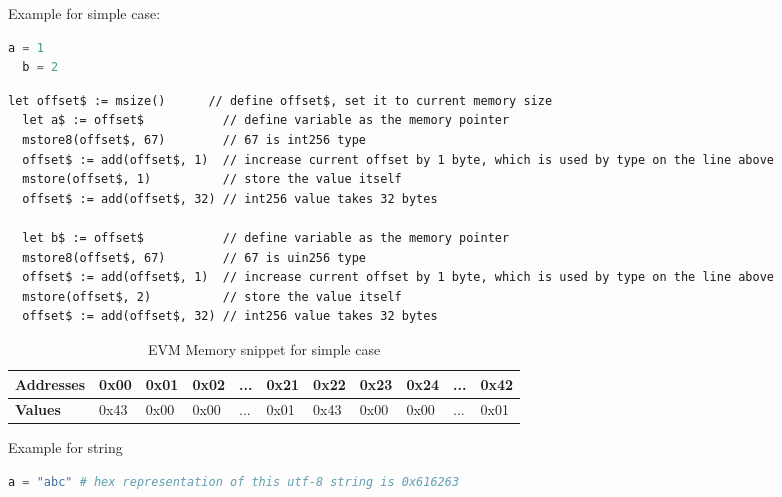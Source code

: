 Example for simple case:
   
\begin{lstlisting}[caption={Elixireum code for simple case}, language=elixir]
  a = 1
  b = 2
\end{lstlisting}

\begin{lstlisting}[caption={Generated yul code for simple case}, language=yul]
  let offset$ := msize()      // define offset$, set it to current memory size 
  let a$ := offset$           // define variable as the memory pointer
  mstore8(offset$, 67)        // 67 is int256 type
  offset$ := add(offset$, 1)  // increase current offset by 1 byte, which is used by type on the line above
  mstore(offset$, 1)          // store the value itself
  offset$ := add(offset$, 32) // int256 value takes 32 bytes

  let b$ := offset$           // define variable as the memory pointer
  mstore8(offset$, 67)        // 67 is uin256 type
  offset$ := add(offset$, 1)  // increase current offset by 1 byte, which is used by type on the line above
  mstore(offset$, 2)          // store the value itself
  offset$ := add(offset$, 32) // int256 value takes 32 bytes
\end{lstlisting}

\begin{table}[h!]
  \centering
  \renewcommand{\arraystretch}{1.2} %
  \begin{tabular}{|>{\centering\arraybackslash}m{2cm}|>{\centering\arraybackslash}m{1cm}|>{\centering\arraybackslash}m{1cm}|>{\centering\arraybackslash}m{1cm}|>{\centering\arraybackslash}m{0.75cm}|>{\centering\arraybackslash}m{1cm}|>{\centering\arraybackslash}m{1cm}|>{\centering\arraybackslash}m{1cm}|>{\centering\arraybackslash}m{1cm}|>{\centering\arraybackslash}m{0.75cm}|>{\centering\arraybackslash}m{1cm}|}
  \hline
  \textbf{Addresses} & 0x00 & 0x01 & 0x02 & ... & 0x21 & 0x22 & 0x23 & 0x24 & ... & 0x42 \\ \hline
  \textbf{Values}    & 0x43 & 0x00 & 0x00 & ... & 0x01 & 0x43 & 0x00 & 0x00 & ... & 0x01 \\ \hline
  \end{tabular}
  \caption{EVM Memory snippet for simple case}
  \label{tab:evm_memory}
  \end{table}

Example for string

\begin{lstlisting}[caption={Elixireum code for string case}, language=elixir]
  a = "abc" # hex representation of this utf-8 string is 0x616263
\end{lstlisting}
  
